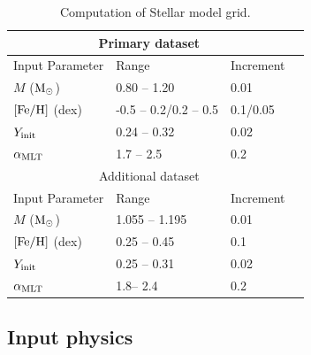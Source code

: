 \begin{table}
	\centering
	\caption{Computation of Stellar model grid.}
	\label{tab:grid}
	\begin{tabular}{llll} %
		\hline
		\multicolumn{3}{c}{Primary dataset}\\
		\hline
		Input Parameter & Range & Increment \\
        \hline
	$M$ ($\rm M_{\odot}$) & 0.80 -- 1.20 &  0.01\\
        $\rm{[Fe/H]}$ (dex) & -0.5 -- 0.2/0.2 -- 0.5 & 0.1/0.05\\
        	$Y_{\rm init}$ & 0.24 -- 0.32 & 0.02\\
        $\alpha_{\rm{MLT}}$  & 1.7 -- 2.5&  0.2\\
        \hline
       \multicolumn{3}{c}{Additional dataset}\\
	\hline
	Input Parameter & Range & Increment \\
        \hline
	$M$ ($\rm M_{\odot}$)  & 1.055 -- 1.195 &  0.01\\
        $\rm{[Fe/H]}$ (dex) & 0.25 -- 0.45 & 0.1\\
        	$Y_{\rm init}$ & 0.25 -- 0.31 & 0.02\\
        $\alpha_{\rm{MLT}}$  & 1.8-- 2.4&  0.2\\
	\hline
	\end{tabular}
\end{table}

\subsection{Input physics}\label{subsec:stellar_model}

